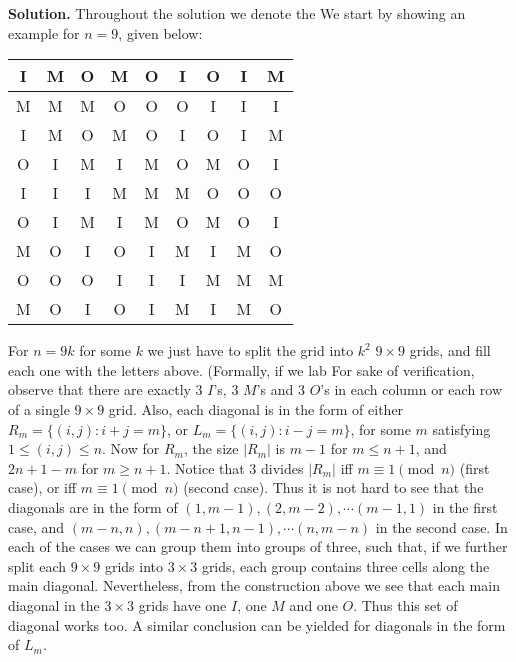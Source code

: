 \documentclass[11pt,a4paper]{article}
\begin{document}
\begin{itemize}
\textbf{Solution.} 
Throughout the solution we denote the 
We start by showing an example for $n=9$, given below: 
\begin{center}
\begin{tabular}{|c|c|c||c|c|c||c|c|c|}
\hline
I & M & O & M & O & I & O & I & M\\
\hline
M & M & M & O & O & O & I & I & I\\
\hline
I & M & O & M & O & I & O & I & M\\
\hline
\hline
O & I & M & I & M & O & M & O & I\\
\hline
I & I & I & M & M & M & O & O & O\\
\hline
O & I & M & I & M & O & M & O & I\\
\hline
\hline
M & O & I & O & I & M & I & M & O\\
\hline
O & O & O & I & I & I & M & M & M\\
\hline
M & O & I & O & I & M & I & M & O\\
\hline
\end{tabular}
\end{center}
For $n=9k$ for some $k$ we just have to split the grid into $k^2$ $9\times 9$ grids, and fill each one with the letters above. 
(Formally, if we lab
For sake of verification, observe that there are exactly 3 $I$'s, 3 $M$'s and 3 $O$'s in each column or each row of a single $9\times 9$ grid. 
Also, each diagonal is in the form of either $R_m=\{(i, j): i+j=m\}$, or $L_m=\{(i, j): i-j=m\}$, 
for some $m$ satisfying $1\le (i, j)\le n$. 
Now for $R_m$, the size $|R_m|$ is $m-1$ for $m\le n+1$, and $2n+1-m$ for $m\ge n+1$. 
Notice that 3 divides $|R_m|$ iff $m\equiv 1\pmod{n}$ (first case), or iff  $m\equiv 1\pmod{n}$ (second case). 
Thus it is not hard to see that the diagonals are in the form of 
$(1, m-1), (2, m-2), \cdots (m-1, 1)$ in the first case, and 
$(m-n, n), (m-n+1, n-1), \cdots (n, m-n)$ in the second case. 
In each of the cases we can group them into groups of three, such that, if we further split each $9\times 9$ grids into $3\times 3$ grids, each group contains three cells along the main diagonal. 
Nevertheless, from the construction above we see that each main diagonal in the $3\times 3$ grids have one $I$, one $M$ and one $O$. 
Thus this set of diagonal works too. 
A similar conclusion can be yielded for diagonals in the form of $L_m$. 


\end{itemize}
\end{document}
